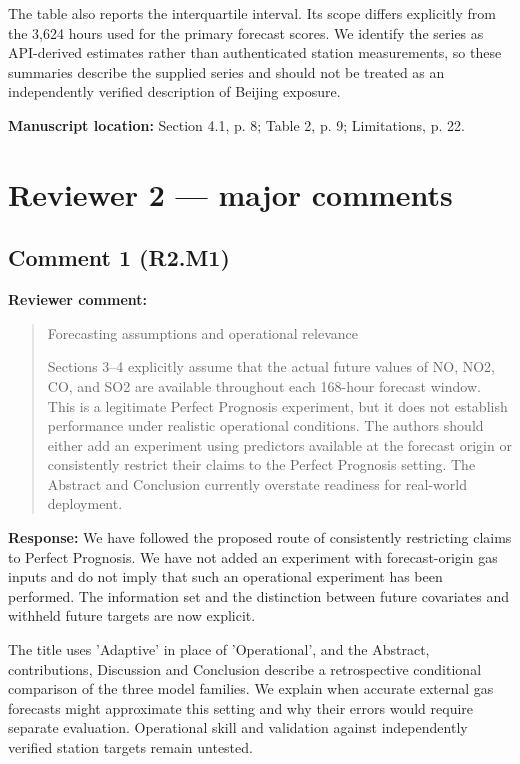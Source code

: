 \documentclass[11pt,a4paper]{article}
\begin{document}
The table also reports the interquartile interval. Its scope differs explicitly from the 3,624 hours used for the primary forecast scores. We identify the series as API-derived estimates rather than authenticated station measurements, so these summaries describe the supplied series and should not be treated as an independently verified description of Beijing exposure.

\textbf{Manuscript location:} Section 4.1, p. 8; Table 2, p. 9; Limitations, p. 22.
\clearpage
\section*{Reviewer 2 --- major comments}
\begin{samepage}
\subsection*{Comment 1 (R2.M1)}
\textbf{Reviewer comment:}
\begin{quote}\small Forecasting assumptions and operational relevance

Sections 3--4 explicitly assume that the actual future values of NO, NO2, CO, and SO2 are available throughout each 168-hour forecast window. This is a legitimate Perfect Prognosis experiment, but it does not establish performance under realistic operational conditions. The authors should either add an experiment using predictors available at the forecast origin or consistently restrict their claims to the Perfect Prognosis setting. The Abstract and Conclusion currently overstate readiness for real-world deployment.\end{quote}
\end{samepage}
\textbf{Response:}
We have followed the proposed route of consistently restricting claims to Perfect Prognosis. We have not added an experiment with forecast-origin gas inputs and do not imply that such an operational experiment has been performed. The information set and the distinction between future covariates and withheld future targets are now explicit.

The title uses 'Adaptive' in place of 'Operational', and the Abstract, contributions, Discussion and Conclusion describe a retrospective conditional comparison of the three model families. We explain when accurate external gas forecasts might approximate this setting and why their errors would require separate evaluation. Operational skill and validation against independently verified station targets remain untested.
\end{document}
